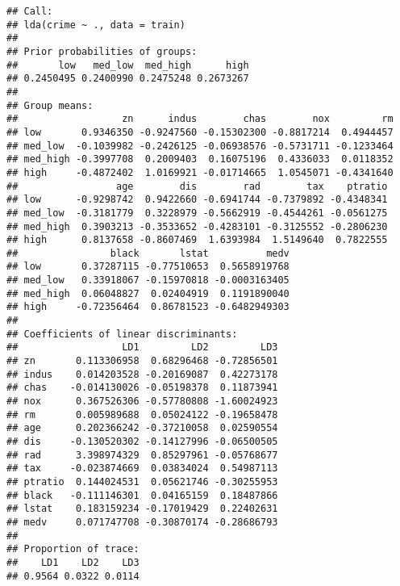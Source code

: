 \documentclass[]{article}
\begin{document}
\begin{verbatim}
## Call:
## lda(crime ~ ., data = train)
## 
## Prior probabilities of groups:
##       low   med_low  med_high      high 
## 0.2450495 0.2400990 0.2475248 0.2673267 
## 
## Group means:
##                  zn      indus        chas        nox         rm
## low       0.9346350 -0.9247560 -0.15302300 -0.8817214  0.4944457
## med_low  -0.1039982 -0.2426125 -0.06938576 -0.5731711 -0.1233464
## med_high -0.3997708  0.2009403  0.16075196  0.4336033  0.0118352
## high     -0.4872402  1.0169921 -0.01714665  1.0545071 -0.4341640
##                 age        dis        rad        tax    ptratio
## low      -0.9298742  0.9422660 -0.6941744 -0.7379892 -0.4348341
## med_low  -0.3181779  0.3228979 -0.5662919 -0.4544261 -0.0561275
## med_high  0.3903213 -0.3533652 -0.4283101 -0.3125552 -0.2806230
## high      0.8137658 -0.8607469  1.6393984  1.5149640  0.7822555
##                black       lstat          medv
## low       0.37287115 -0.77510653  0.5658919768
## med_low   0.33918067 -0.15970818 -0.0003163405
## med_high  0.06048827  0.02404919  0.1191890040
## high     -0.72356464  0.86781523 -0.6482949303
## 
## Coefficients of linear discriminants:
##                  LD1         LD2         LD3
## zn       0.113306958  0.68296468 -0.72856501
## indus    0.014203528 -0.20169087  0.42273178
## chas    -0.014130026 -0.05198378  0.11873941
## nox      0.367526306 -0.57780808 -1.60024923
## rm       0.005989688  0.05024122 -0.19658478
## age      0.202366242 -0.37210058  0.02590554
## dis     -0.130520302 -0.14127996 -0.06500505
## rad      3.398974329  0.85297961 -0.05768677
## tax     -0.023874669  0.03834024  0.54987113
## ptratio  0.144024531  0.05621746 -0.30255953
## black   -0.111146301  0.04165159  0.18487866
## lstat    0.183159234 -0.17019429  0.22402631
## medv     0.071747708 -0.30870174 -0.28686793
## 
## Proportion of trace:
##    LD1    LD2    LD3 
## 0.9564 0.0322 0.0114
\end{verbatim}
\end{document}

